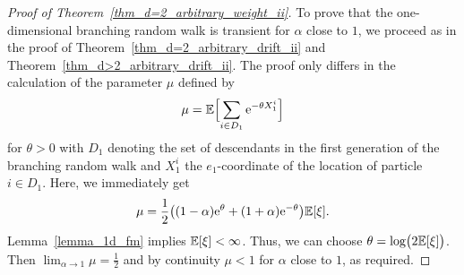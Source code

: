 \begin{proof}[Proof of Theorem~\ref{thm_d=2_arbitrary_weight_ii}]
To prove that the one-dimensional branching random walk is transient for $\alpha$ close to $1$, we proceed as in the proof of Theorem~\ref{thm_d=2_arbitrary_drift_ii} and Theorem~\ref{thm_d>2_arbitrary_drift_ii}. The proof only differs in the calculation of the parameter $\mu$ defined by  
\begin{equation*}
 \mu = \mathbb{E} \Bigl[ \sum_{i \in D_1} \mathrm{e}^{-\theta  X_1^i} \Bigr] 
\end{equation*}
for $\theta >0$ with $D_1$ denoting the set of descendants in the first generation of the branching random walk and $X_1^i$ the $e_1$-coordinate of the location of particle $i \in D_1$. Here, we immediately get
\begin{equation*}
 \mu = \frac12  \bigl((1-\alpha) \mathrm{e}^{\theta} + (1+\alpha) \mathrm{e}^{-\theta}\bigr) \mathbb{E}[\xi].
\end{equation*}
Lemma~\ref{lemma_1d_fm} implies $\mathbb{E}[\xi] < \infty$. Thus, we can choose $\theta = \log\bigl(2\mathbb{E}[\xi]\bigr)$. Then $\lim_{\alpha \to 1} \mu = \frac12$ and by continuity $\mu < 1$ for $\alpha$ close to $1$, as required.
\end{proof}



